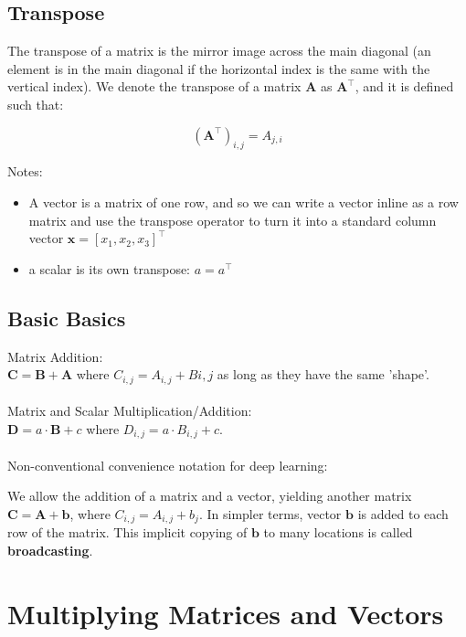 \documentclass[11pt,twocolumn]{report}
\begin{document}
\subsection{Transpose}
\begin{flushleft}
  The transpose of a matrix is the mirror image across the main diagonal (an
  element is in the main diagonal if the horizontal index is the same with the
  vertical index). We denote the transpose of a matrix $\bm{A}$ as
  $\bm{A}^\intercal$, and it is defined such that:
\end{flushleft}
\begin{equation}
  (\bm{A}^\intercal)_{i, j} = A_{j, i}
\end{equation}

Notes: 
\begin{itemize}
  \item A vector is a matrix of one row, and so we can write a vector inline as
    a row matrix and use the transpose operator to turn it into a standard
    column vector $\bm{x} = [x_1, x_2, x_3]^\intercal$
  \item a scalar is its own transpose: $a = a^\intercal$
\end{itemize}

\subsection{Basic Basics}
Matrix Addition:\\
$\bm{C} = \bm{B} + \bm{A}$ where $C_{i, j} = A_{i, j} + B{i, j}$ as long as
they have the same 'shape'.\\\\
Matrix and Scalar Multiplication/Addition:\\
$\bm{D} = a \cdot \bm{B} + c$ where $D_{i, j} = a \cdot B_{i, j} + c$.\\\\
Non-conventional convenience notation for deep learning:
\begin{flushleft}
  We allow the addition of a matrix and a vector, yielding another matrix 
  $\bm{C} = \bm{A} + \bm{b}$, where $C_{i, j} = A_{i, j} + b_j$. In simpler
  terms, vector $\bm{b}$ is added to each row of the matrix. This implicit
  copying of $\bm{b}$ to many locations is called \textbf{broadcasting}.
\end{flushleft}

\section{Multiplying Matrices and Vectors}
\end{document}
